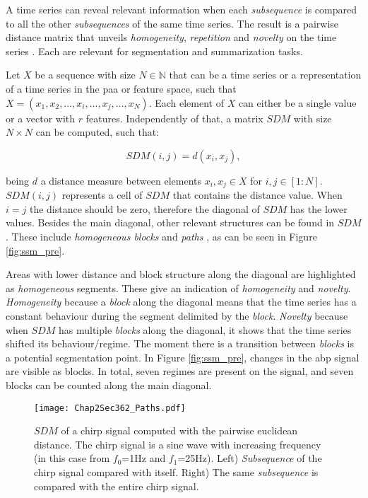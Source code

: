 A time series can reveal relevant information when each \textit{subsequence} is compared to all the other \textit{subsequences} of the same time series. The result is a pairwise distance matrix that unveils \textit{homogeneity}, \textit{repetition} and \textit{novelty} on the time series \cite{fmp1}. Each are relevant for segmentation and summarization tasks.

Let $X$ be a sequence with size $N \in \mathbb{N}$ that can be a time series or a representation of a time series in the \gls{paa} or feature space, such that $X = (x_1, x_2, ..., x_i, ..., x_j, ..., x_N)$. Each element of $X$ can either be a single value or a vector with $r$ features. Independently of that, a matrix $SDM$ with size $N \times N$ can be computed, such that:

\begin{equation}
\label{eq:sdm}
SDM(i,j)= d(x_i, x_j),
\end{equation}

being $d$ a distance measure between elements $x_i, x_j \in X$ for $i, j \in [1:N]$. $SDM(i,j)$ represents a cell of $SDM$ that contains the distance value. When $i=j$ the distance should be zero, therefore the diagonal of $SDM$ has the lower values. Besides the main diagonal, other relevant structures can be found in $SDM$. These include \textit{homogeneous blocks} and \textit{paths} \cite{fmp1, fmp2}, as can be seen in Figure \ref{fig:ssm_pre}.

Areas with lower distance and block structure along the diagonal are highlighted as \textit{homogeneous} segments. These give an indication of \textit{homogeneity} and \textit{novelty}. \textit{Homogeneity} because a \textit{block} along the diagonal means that the time series has a constant behaviour during the segment delimited by the \textit{block}. \textit{Novelty} because when $SDM$ has multiple \textit{blocks} along the diagonal, it shows that the time series shifted its behaviour/regime. The moment there is a transition between \textit{blocks} is a potential segmentation point. In Figure \ref{fig:ssm_pre}, changes in the \gls{abp} signal are visible as blocks. In total, seven regimes are present on the signal, and seven blocks can be counted along the main diagonal.

\begin{figure}
\centering
\texttt{[image: Chap2Sec362\_Paths.pdf]}
\caption{$SDM$ of a chirp signal computed with the pairwise euclidean distance. The chirp signal is a sine wave with increasing frequency (in this case from $f_0$=1Hz and $f_1$=25Hz)\cite{scipy}. Left) \textit{Subsequence} of the chirp signal compared with itself. Right) The same \textit{subsequence} is compared with the entire chirp signal.}
\label{fig:sdm_periods}
\end{figure}

